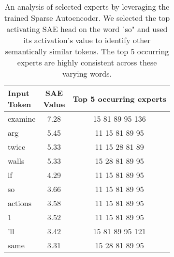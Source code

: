 \begin{table}[]
    \centering
    \begin{tabular}{lcc}
        \makecell{Input \\ Token} & \makecell{SAE \\ Value}  & Top 5 occurring experts \\
        \toprule
         examine & 7.28 & 15 \hfill 81 \hfill 89 \hfill 95 \hfill 136 \\
         arg & 5.45 & 11 \hfill 15 \hfill 81 \hfill 89 \hfill 95 \\
         twice & 5.33 & 11 \hfill 15 \hfill 28 \hfill 81 \hfill 89 \\
         walls & 5.33 & 15 \hfill 28 \hfill 81 \hfill 89 \hfill 95 \\
         if & 4.29 & 11 \hfill 15 \hfill 81 \hfill 89 \hfill 95 \\
         so & 3.66 & 11 \hfill 15 \hfill 81 \hfill 89 \hfill 95 \\
         actions & 3.58 & 11 \hfill 15 \hfill 81 \hfill 89 \hfill 95 \\
         1 & 3.52 & 11 \hfill 15 \hfill 81 \hfill 89 \hfill 95 \\
         'll & 3.42 & 15 \hfill 81 \hfill 89 \hfill 95 \hfill 121 \\
         same & 3.31 & 15 \hfill 28 \hfill 81 \hfill 89 \hfill 95 \\
        \bottomrule
    \end{tabular}
    \caption{An analysis of selected experts by leveraging the trained Sparse Autoencoder. We selected the top activating SAE head on the word "so" and used its activation's value to identify other semantically similar tokens. The top 5 occurring experts are highly consistent across these varying words.}
    \label{tab:sae_so}
\end{table}
